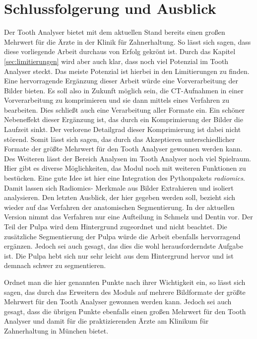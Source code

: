 \chapter{Schlussfolgerung und Ausblick}
\label{chap:schlussfolgerung} Der Tooth Analyser bietet mit dem aktuellen Stand bereits
einen großen Mehrwert für die Ärzte in der Klinik für Zahnerhaltung. So lässt
sich sagen, dass diese vorliegende Arbeit durchaus von Erfolg gekrönt ist. Durch
das Kapitel \ref{sec:limitierungen} wird aber auch klar, dass noch viel Potenzial
im Tooth Analyser steckt. Das meiste Potenzial ist hierbei in den Limitierungen
zu finden. Eine hervorragende Ergänzung dieser Arbeit würde eine Vorverarbeitung
der Bilder bieten. Es soll also in Zukunft möglich sein, die \ac{CT}-Aufnahmen
in einer Vorverarbeitung zu komprimieren und sie dann mittels eines Verfahren zu
bearbeiten. Dies schließt auch eine Verarbeitung aller Formate ein. Ein schöner
Nebeneffekt dieser Ergänzung ist, das durch ein Komprimierung der Bilder die Laufzeit
sinkt. Der verlorene Detailgrad dieser Komprimierung ist dabei nicht störend. Somit
lässt sich sagen, das durch das Akzeptieren unterschiedlicher Formate der größte
Mehrwert für den Tooth Analyser gewonnen werden kann. Des Weiteren lässt der Bereich
Analysen im Tooth Analyser noch viel Spielraum. Hier gibt es diverse
Möglichkeiten, das Modul noch mit weiteren Funktionen zu bestücken. Eine gute
Idee ist hier eine Integration des Pythonpakets \textit{radiomics}. Damit lassen
sich Radiomics- Merkmale aus Bilder Extrahieren und isoliert analysieren. Den
letzten Ausblick, der hier gegeben werden soll, bezieht sich wieder auf das
Verfahren der anatomischen Segmentierung. In der aktuellen Version nimmt das Verfahren
nur eine Aufteilung in Schmelz und Dentin vor. Der Teil der Pulpa wird dem
Hintergrund zugeordnet und nicht beachtet. Die zusätzliche Segmentierung der Pulpa
würde die Arbeit ebenfalls hervorragend ergänzen. Jedoch sei auch gesagt, das dies
die wohl herausforderndste Aufgabe ist. Die Pulpa hebt sich nur sehr leicht aus
dem Hintergrund hervor und ist demnach schwer zu segmentieren.

Ordnet man die hier genannten Punkte nach ihrer Wichtigkeit ein, so lässt sich sagen,
das durch das Erweitern des Moduls auf mehrere Bildformate der größte Mehrwert
für den Tooth Analyser gewonnen werden kann. Jedoch sei auch gesagt, dass die
übrigen Punkte ebenfalls einen großen Mehrwert für den Tooth Analyser und damit
für die praktizierenden Ärzte am Klinikum für Zahnerhaltung in München bietet.
